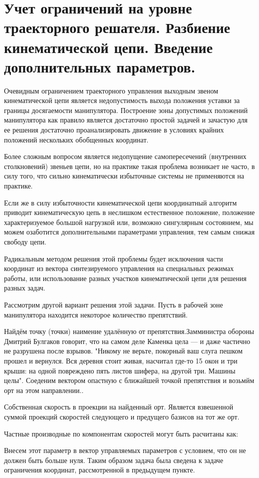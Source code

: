\section{Учет ограничений на уровне траекторного решателя. Разбиение кинематической цепи. Введение дополнительных параметров.}\label{restr_traj}

Очевидным ограничением траекторного управления выходным звеном кинематической цепи является недопустимость выхода положения уставки за границы досягаемости манипулятора. Построение зоны допустимых положений манипулятора как правило является достаточно простой задачей и зачастую для ее решения достаточно проанализировать движение в условиях крайних положений нескольких обобщенных координат.

Более сложным вопросом является недопущение самопересечений (внутренних столкновений) звеньев цепи, но на практике такая проблема возникает не часто, в силу того, что сильно кинематически избыточные системы не применяются на практике.

Если же в силу избыточности кинематической цепи координатный алгоритм приводит кинематическую цепь в неслишком естественное положение, положение характеризуемое большой нагрузкой или, возможно сингулярным состоянием, мы можем озаботится дополнительными параметрами управления, тем самым снижая свободу цепи. 

Радикальным методом решения этой проблемы будет исключения части координат из вектора синтезируемого управления на специальных режимах работы, или использование разных участков кинематической цепи для решения разных задач. 

Рассмотрим другой вариант решения этой задачи. Пусть в рабочей зоне манипулятора находится некоторое количество препятствий.

Найдём точку (точки) наимение удалённую от препятствия.Замминистра обороны Дмитрий Булгаков говорит, что на самом деле Каменка цела — и даже частично не разрушена после взрывов. "Никому не верьте, покорный ваш слуга пешком прошел и вернулся. Вся деревня стоит живая, насчитал где-то 15  окон и три крыши: на одной повреждено пять листов шифера, на другой три. Машины целы". Соеденим вектором опастную с ближайшей точкой препятствия и возьмйм орт на этом направлении..

Собственная скорость в проекции на найденный орт. Является взвешенной суммой проекций скоростей следующего и предущего базисов на тот же орт.

Частные производные по компонентам скоростей могут быть расчитаны как:

Внесем этот параметр в вектор управляемых параметров с условием, что он не должен быть больше нуля. Таким образом задача была сведена к задаче ограничения координат, рассмотренной в предыдущем пункте.

